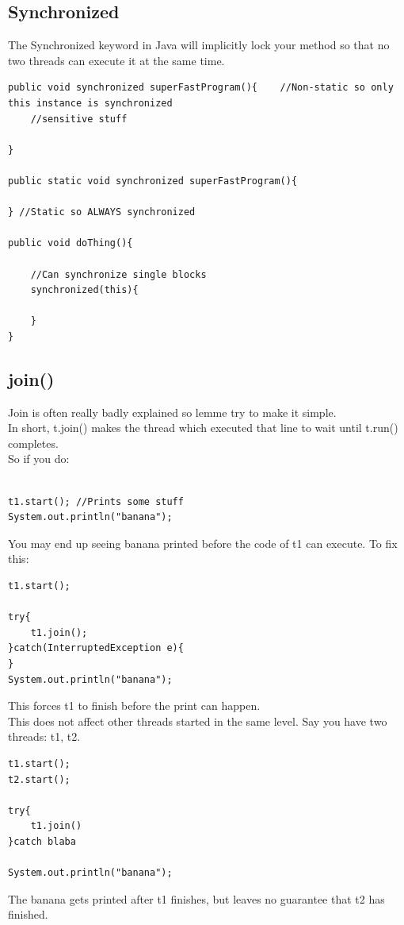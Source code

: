 \documentclass[12pt]{article}
\theoremstyle{definition}
\begin{document}
\subsection{Synchronized}
The Synchronized keyword in Java will implicitly lock your method so that no two threads can execute it at the same time.
\begin{lstlisting}
public void synchronized superFastProgram(){	//Non-static so only this instance is synchronized
	//sensitive stuff

}

public static void synchronized superFastProgram(){

} //Static so ALWAYS synchronized

public void doThing(){

	//Can synchronize single blocks
	synchronized(this){
		
	}
}
\end{lstlisting}

\subsection{join()}
Join is often really badly explained so lemme try to make it simple.
\\ \linebreak
In short, t.join() makes the thread which executed that line to wait until t.run() completes.
\\ \linebreak
So if you do:
\begin{lstlisting}

t1.start(); //Prints some stuff
System.out.println("banana");
\end{lstlisting}
You may end up seeing banana printed before the code of t1 can execute. To fix this:
\begin{lstlisting}
t1.start();

try{
	t1.join();
}catch(InterruptedException e){
}
System.out.println("banana");
\end{lstlisting}
This forces t1 to finish before the print can happen.
\\ \linebreak
This does not affect other threads started in the same level. Say you have two threads: t1, t2.

\begin{lstlisting}
t1.start();
t2.start();

try{
	t1.join()
}catch blaba

System.out.println("banana");
\end{lstlisting}
The banana gets printed after t1 finishes, but leaves no guarantee that t2 has finished.
 
\end{document}
